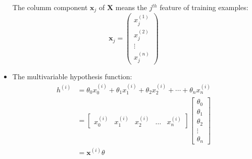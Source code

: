 \begin{itemize}
    The columm component $\mathbf{x}_j$ of $\mathbf{X}$ means the $j^{th}$ feature of training examples:
    \begin{equation}
        \mathbf{x}_j = \left(\begin{matrix} x_j^{(1)} \\ x_j^{(2)} \\ \vdots \\ x_j^{(n)} \end{matrix}\right)
    \end{equation}

    \item The multivariable hypothesis function:
    \begin{equation}
        \begin{split}
            h^{(i)} & = \theta_0 x_0^{(i)} + \theta_1 x_1^{(i)} + \theta_2 x_2^{(i)} + \cdots + \theta_n x_n^{(i)}\\
            & = \left[ \begin{matrix} x_0^{(i)} & x_1^{(i)} & x_2^{(i)} & \dots & x_n^{(i)} \end{matrix} \right] 
                \left[ \begin{matrix} \theta_0 \\ \theta_1 \\ \theta_2 \\ \vdots \\ \theta_n \end{matrix} \right] \\
            & = \mathbf{x}^{(i)}\theta
        \end{split}
    \end{equation}                
    

\end{itemize}
